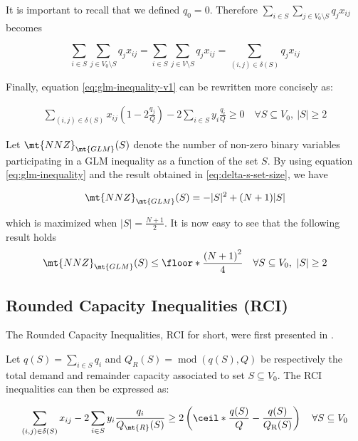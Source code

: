 It is important to recall that we defined $q_0 = 0$.
Therefore $\sum_{i \in S} \sum_{j \in V_0 \setminus S} q_j  x_{ij}$ becomes

\begin{equation}
	\sum_{i \in S} \sum_{j \in V_0 \setminus S} q_j  x_{ij} = \sum_{i \in S} \sum_{j \in V \setminus S} q_j  x_{ij} = \sum_{(i, j) \in \delta(S)} q_j x_{ij}
\end{equation}

Finally, equation \eqref{eq:glm-inequality-v1} can be rewritten more concisely as:

\begin{equation}\label{eq:glm-inequality}
	\begin{split}
		\sum_{(i, j) \in \delta(S)} x_{ij} \left( 1 - 2 \frac{q_j}{Q} \right)  -2 \sum_{i \in S} y_i \frac{q_i}{Q}  \ge  0   \quad \forall S \subseteq V_0,\ |S| \ge 2
	\end{split}
\end{equation}


Let $\mt{NNZ}_{\mt{GLM}}(S)$ denote the number of non-zero binary variables participating in a GLM inequality as a function of the set $S$.
By using equation \eqref{eq:glm-inequality} and the result obtained in \eqref{eq:delta-s-set-size}, we have

\begin{equation}
	\mt{NNZ}_{\mt{GLM}}(S) = -|S|^2 + (N + 1)|S|
\end{equation}

which is maximized when $|S| = \frac{N+1}{2}$.
It is now easy to see that the following result holds
\begin{equation}\label{eq:glm-nnz-ub}
	\mt{NNZ}_{\mt{GLM}}(S) \le \floor*{ \frac{\left( N + 1 \right)^2}{4}} \quad \forall S \subseteq V_0,\ |S| \ge 2
\end{equation}


\subsection{Rounded Capacity Inequalities (RCI)}
The Rounded Capacity Inequalities, RCI for short, were first presented in \cite{achuthan_capacitated_1998}.

Let $q(S) = \sum_{i \in S} q_i$ and $Q_{R}(S) = \mathop{mod}\left(q(S), Q \right)$ be respectively the total demand and remainder capacity associated to set $S \subseteq V_0$.
The RCI inequalities can then be expressed as:

\begin{equation}\label{eq:rci-inequality}
	\begin{split}
		\sum_{(i, j) \in \delta(S)} x_{ij} -2 \sum_{i \in S} y_i {\frac{q_i}{Q_\mt{R}(S)}}    \ge   2 \left( \ceil*{ \frac{q(S)}{Q}} - \frac{q(S)}{Q_{\mathrm{R}}(S)} \right) \quad \forall S \subseteq V_0
	\end{split}
\end{equation}

